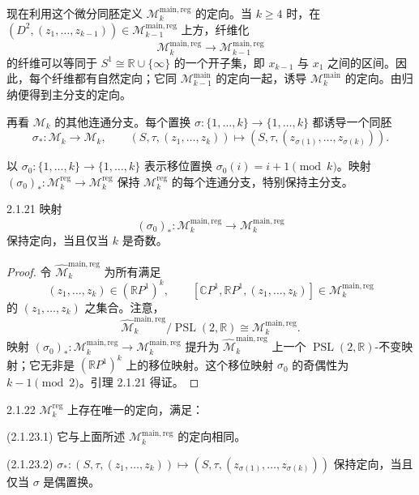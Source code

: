 现在利用这个微分同胚定义 $\mathcal M_k^{\mathrm{main,reg}}$ 的定向。当
$k\geq4$ 时，在
$(D^2,(z_1,\ldots,z_{k-1}))\in
\mathcal M_{k-1}^{\mathrm{main,reg}}$ 上方，纤维化
\[
  \mathcal M_k^{\mathrm{main,reg}}
  \longrightarrow\mathcal M_{k-1}^{\mathrm{main,reg}}
\]
的纤维可以等同于 $S^1\cong\mathbb R\cup\{\infty\}$ 的一个开子集，即
$x_{k-1}$ 与 $x_1$ 之间的区间。因此，每个纤维都有自然定向；它同
$\mathcal M_{k-1}^{\mathrm{main}}$ 的定向一起，诱导
$\mathcal M_k^{\mathrm{main}}$ 的定向。由归纳便得到主分支的定向。

再看 $\mathcal M_k$ 的其他连通分支。每个置换
$\sigma:\{1,\ldots,k\}\to\{1,\ldots,k\}$ 都诱导一个同胚
\[
  \sigma_*:\mathcal M_k\longrightarrow\mathcal M_k,
  \qquad
  (S,\tau,(z_1,\ldots,z_k))
  \longmapsto(S,\tau,(z_{\sigma(1)},\ldots,z_{\sigma(k)})).
\]

以 $\sigma_0:\{1,\ldots,k\}\to\{1,\ldots,k\}$ 表示移位置换
$\sigma_0(i)=i+1\pmod{k}$。映射
$(\sigma_0)_*:\mathcal M_k^{\mathrm{reg}}
\to\mathcal M_k^{\mathrm{reg}}$ 保持
$\mathcal M_k^{\mathrm{reg}}$ 的每个连通分支，特别保持主分支。

\begin{lemma}{2.1.21}\label{lem:2-1-21}
映射
\[
  (\sigma_0)_*:\mathcal M_k^{\mathrm{main,reg}}
  \longrightarrow\mathcal M_k^{\mathrm{main,reg}}
\]
保持定向，当且仅当 $k$ 是奇数。
\end{lemma}

\begin{proof}
令 $\widehat{\mathcal M}_k^{\mathrm{main,reg}}$ 为所有满足
\[
  (z_1,\ldots,z_k)\in(\mathbb RP^1)^k,
  \qquad
  [\mathbb CP^1,\mathbb RP^1,(z_1,\ldots,z_k)]
  \in\mathcal M_k^{\mathrm{main,reg}}
\]
的 $(z_1,\ldots,z_k)$ 之集合。注意，
\[
  \widehat{\mathcal M}_k^{\mathrm{main,reg}}/\operatorname{PSL}(2,\mathbb R)
  \cong\mathcal M_k^{\mathrm{main,reg}}.
\]
映射
$(\sigma_0)_*:\mathcal M_k^{\mathrm{main,reg}}
\to\mathcal M_k^{\mathrm{main,reg}}$ 提升为
$\widehat{\mathcal M}_k^{\mathrm{main,reg}}$ 上一个
$\operatorname{PSL}(2,\mathbb R)$-不变映射；它无非是
$(\mathbb RP^1)^k$ 上的移位映射。这个移位映射 $\sigma_0$ 的奇偶性为
$k-1\pmod 2$。引理 2.1.21 得证。
\end{proof}

\begin{proposition}{2.1.22}\label{prop:2-1-22}
$\mathcal M_k^{\mathrm{reg}}$ 上存在唯一的定向，满足：

\par\smallskip\noindent\textup{(2.1.23.1)}\quad
它与上面所述 $\mathcal M_k^{\mathrm{main,reg}}$ 的定向相同。

\par\smallskip\noindent\textup{(2.1.23.2)}\quad
$\sigma_*:(S,\tau,(z_1,\ldots,z_k))
\mapsto(S,\tau,(z_{\sigma(1)},\ldots,z_{\sigma(k)}))$
保持定向，当且仅当 $\sigma$ 是偶置换。
\end{proposition}

